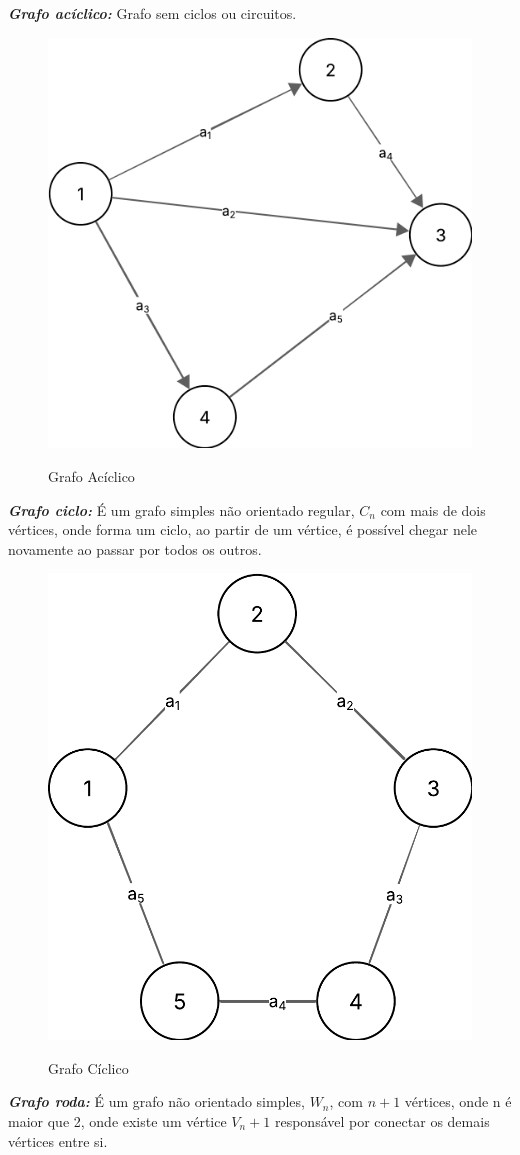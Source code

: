 \textit{\textbf{Grafo acíclico:}} Grafo sem ciclos ou circuitos.\\
\begin{figure} [H]
	\centering
	\caption{Grafo Acíclico}%
	\label{fig:grafAcicl}%
	\includegraphics[width=0.5\linewidth,angle=0]{figuras/tiposgrafos/grafAcicl.png}%
	\\
\end{figure}
\textit{\textbf{Grafo ciclo:}} É um grafo simples não orientado regular, $ C_n $ com mais de dois vértices, onde forma um ciclo, ao partir de um vértice, é possível chegar nele novamente ao passar por todos os outros.\\
\begin{figure} [H]
	\centering
	\caption{Grafo Cíclico}%
	\label{fig:grafCiclo}%
	\includegraphics[width=0.5\linewidth,angle=0]{figuras/tiposgrafos/grafCiclo.png}%
	\\
\end{figure}
\textit{\textbf{Grafo roda:}} É um grafo não orientado simples, $ W_n $, com $ n+1 $ vértices, onde n é maior que 2, onde existe um vértice $ V_n+1 $ responsável por conectar os demais vértices entre si. \\
